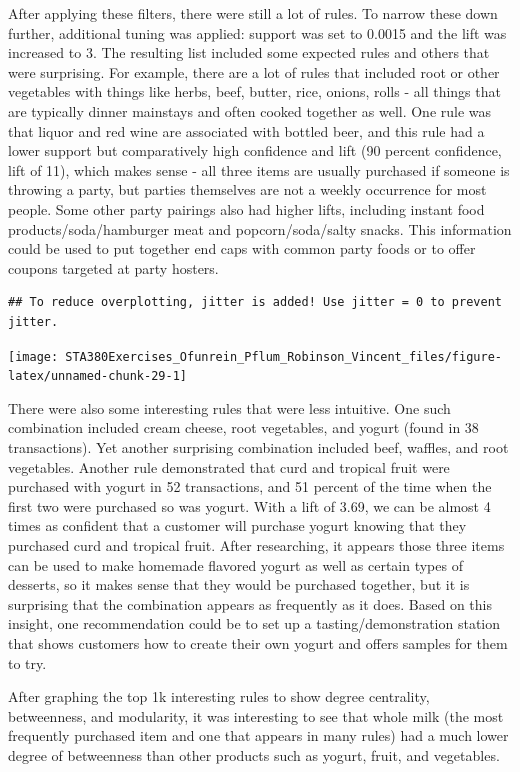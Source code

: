 \documentclass[
]{article}
\begin{document}
After applying these filters, there were still a lot of rules. To narrow
these down further, additional tuning was applied: support was set to
0.0015 and the lift was increased to 3. The resulting list included some
expected rules and others that were surprising. For example, there are a
lot of rules that included root or other vegetables with things like
herbs, beef, butter, rice, onions, rolls - all things that are typically
dinner mainstays and often cooked together as well. One rule was that
liquor and red wine are associated with bottled beer, and this rule had
a lower support but comparatively high confidence and lift (90 percent
confidence, lift of 11), which makes sense - all three items are usually
purchased if someone is throwing a party, but parties themselves are not
a weekly occurrence for most people. Some other party pairings also had
higher lifts, including instant food products/soda/hamburger meat and
popcorn/soda/salty snacks. This information could be used to put
together end caps with common party foods or to offer coupons targeted
at party hosters.

\begin{verbatim}
## To reduce overplotting, jitter is added! Use jitter = 0 to prevent jitter.
\end{verbatim}

\begin{center}\texttt{[image: STA380Exercises\_Ofunrein\_Pflum\_Robinson\_Vincent\_files/figure-latex/unnamed-chunk-29-1]} \end{center}

There were also some interesting rules that were less intuitive. One
such combination included cream cheese, root vegetables, and yogurt
(found in 38 transactions). Yet another surprising combination included
beef, waffles, and root vegetables. Another rule demonstrated that curd
and tropical fruit were purchased with yogurt in 52 transactions, and 51
percent of the time when the first two were purchased so was yogurt.
With a lift of 3.69, we can be almost 4 times as confident that a
customer will purchase yogurt knowing that they purchased curd and
tropical fruit. After researching, it appears those three items can be
used to make homemade flavored yogurt as well as certain types of
desserts, so it makes sense that they would be purchased together, but
it is surprising that the combination appears as frequently as it does.
Based on this insight, one recommendation could be to set up a
tasting/demonstration station that shows customers how to create their
own yogurt and offers samples for them to try.

After graphing the top 1k interesting rules to show degree centrality,
betweenness, and modularity, it was interesting to see that whole milk
(the most frequently purchased item and one that appears in many rules)
had a much lower degree of betweenness than other products such as
yogurt, fruit, and vegetables.
\end{document}
